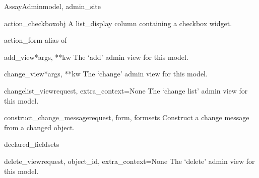 \documentclass[letterpaper,10pt,english]{sphinxmanual}
\begin{document}
\hypertarget{data.admin.AssayAdmin}{}\begin{classdesc}{AssayAdmin}{model, admin\_site}~

\hypertarget{data.admin.AssayAdmin.action_checkbox}{}\begin{methoddesc}{action\_checkbox}{obj}
A list\_display column containing a checkbox widget.
\end{methoddesc}

\hypertarget{data.admin.AssayAdmin.action_form}{}\begin{memberdesc}{action\_form}
alias of 
\end{memberdesc}

\hypertarget{data.admin.AssayAdmin.add_view}{}\begin{methoddesc}{add\_view}{*args, **kw}
The `add' admin view for this model.
\end{methoddesc}

\hypertarget{data.admin.AssayAdmin.change_view}{}\begin{methoddesc}{change\_view}{*args, **kw}
The `change' admin view for this model.
\end{methoddesc}

\hypertarget{data.admin.AssayAdmin.changelist_view}{}\begin{methoddesc}{changelist\_view}{request, extra\_context=None}
The `change list' admin view for this model.
\end{methoddesc}

\hypertarget{data.admin.AssayAdmin.construct_change_message}{}\begin{methoddesc}{construct\_change\_message}{request, form, formsets}
Construct a change message from a changed object.
\end{methoddesc}

\hypertarget{data.admin.AssayAdmin.declared_fieldsets}{}\begin{memberdesc}{declared\_fieldsets}\end{memberdesc}

\hypertarget{data.admin.AssayAdmin.delete_view}{}\begin{methoddesc}{delete\_view}{request, object\_id, extra\_context=None}
The `delete' admin view for this model.
\end{methoddesc}


\end{classdesc}
\end{document}
